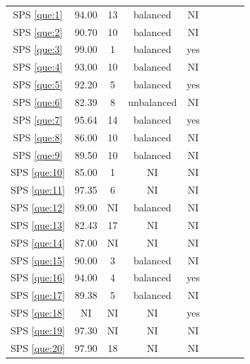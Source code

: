 \documentclass[sensors,review,accept,moreauthors,pdftex]{Definitions/mdpi}
\begin{document}
\begin{table}[H]
\begin{tabular}{ccccccccc}
	SPS \ref{que:1}	&	94.00	&	13	&	balanced	&	NI	\\	
	SPS \ref{que:2}	&	90.70	&	10	&	balanced	&	NI	\\	
	SPS \ref{que:3}	&	99.00	&	1	&	balanced	&	yes	\\	
	SPS \ref{que:4}	&	93.00	&	10	&	balanced	&	NI	\\	
	SPS \ref{que:5}	&	92.20	&	5	&	balanced	&	yes	\\	
	SPS \ref{que:6}	&	82.39	&	8	&	unbalanced	&	NI	\\	
	SPS \ref{que:7}	&	95.64	&	14	&	balanced	&	yes	\\	
	SPS \ref{que:8}	&	86.00	&	10	&	balanced	&	NI	\\	
	SPS \ref{que:9}	&	89.50	&	10	&	balanced	&	NI	\\	
	SPS \ref{que:10}	&	85.00	&	1	&	NI	&	NI	\\	
	SPS \ref{que:11}	&	97.35	&	6	&	NI	&	NI	\\	
	SPS \ref{que:12}	&	89.00	&	NI	&	balanced	&	NI	\\	
	SPS \ref{que:13}	&	82.43	&	17	&	NI	&	NI	\\	
	SPS \ref{que:14}	&	87.00	&	NI	&	NI	&	NI	\\	
	SPS \ref{que:15}	&	90.00	&	3	&	balanced	&	NI	\\	
	SPS \ref{que:16}	&	94.00	&	4	&	balanced	&	yes	\\	
	SPS \ref{que:17}	&	89.38	&	5	&	balanced	&	NI	\\	
	SPS \ref{que:18}	&	NI	&	NI	&	NI	&	yes	\\	
	SPS \ref{que:19}	&	97.30	&	NI	&	NI	&	NI	\\	
	SPS \ref{que:20}	&	97.90	&	18	&	NI	&	NI	\\	
	
		\bottomrule
		\end{tabular}
\end{table}
\end{document}
